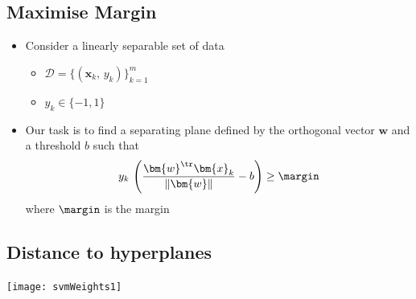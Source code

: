 
\begin{slide}
\section{Maximise Margin}

\begin{PauseHighLight}
  \begin{itemize}
  \item Consider a linearly separable set of data
    \begin{itemize}
    \item $\mathcal{D} = \{(\bm{x}_k,\,y_k)\}_{k=1}^m$
    \item $y_k\in \{-1,1\}$\pause
    \end{itemize}
  \item Our task is to find a separating plane defined by the orthogonal
    vector $\bm{w}$ and a threshold $b$ such that
    \begin{align*}
      y_k\,\left(\frac{\bm{w}^\tr \bm{x}_k}{\| \bm{w} \|} - b\right)
      \geq \margin
    \end{align*}
    where $\margin$ is the margin\pause
  \end{itemize}
\end{PauseHighLight}

\end{slide}


\begin{slide}
\section[-1]{Distance to hyperplanes}

\pb\pause
\begin{center}
  \texttt{[image: svmWeights1]}
\end{center}
\end{slide}


